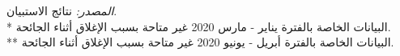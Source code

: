 \textit{المصدر:} نتائج الاستبيان.\\
* البيانات الخاصة بالفترة يناير - مارس 2020 غير متاحة بسبب الإغلاق أثناء الجائحة.\\
** البيانات الخاصة بالفترة أبريل - يونيو 2020 غير متاحة بسبب الإغلاق أثناء الجائحة.